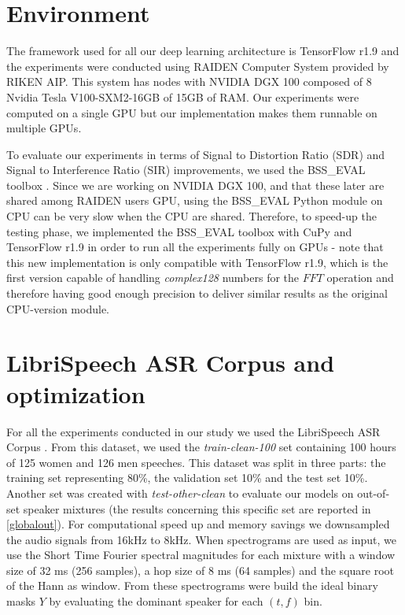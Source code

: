 \documentclass[master, tikz, final,11pt, dvipdfmx]{iscs-thesis}
\begin{document}
\section{Environment}

The framework used for all our deep learning architecture is TensorFlow r1.9 \cite{TF} and the experiments were conducted using RAIDEN Computer System provided by RIKEN AIP. This system has nodes with NVIDIA DGX 100 composed of 8 Nvidia Tesla V100-SXM2-16GB of 15GB of RAM. Our experiments were computed on a single GPU but our implementation makes them runnable on multiple GPUs. 

To evaluate our experiments in terms of Signal to Distortion Ratio (SDR) and Signal to Interference Ratio (SIR) improvements, we used the BSS\_EVAL toolbox \cite{BSS}. Since we are working on NVIDIA DGX 100, and that these later are shared among RAIDEN users GPU, using the BSS\_EVAL Python module on CPU can be very slow when the CPU are shared. Therefore, to speed-up the testing phase, we implemented the BSS\_EVAL toolbox with CuPy \cite{cupy} and TensorFlow r1.9 in order to run all the experiments fully on GPUs - note that this new implementation is only compatible with TensorFlow r1.9, which is the first version capable of handling \textit{complex128} numbers for the $FFT$ operation and therefore having good enough precision to deliver similar results as the original CPU-version module.

\section{LibriSpeech ASR Corpus and optimization}

For all the experiments conducted in our study we used the LibriSpeech ASR Corpus \cite{LIBRI}. From this dataset, we used the \textit{train-clean-100} set containing 100 hours of 125 women and 126 men speeches. This dataset was split in three parts: the training set representing 80\%, the validation set 10\% and the test set 10\%. Another set was created with \textit{test-other-clean} to evaluate our models on out-of-set speaker mixtures (the results concerning this specific set are reported in \autoref{globalout}). For computational speed up and memory savings we downsampled the audio signals from 16kHz to 8kHz.
When spectrograms are used as input, we use the Short Time Fourier spectral magnitudes for each mixture with a window size of 32 ms (256 samples), a hop size of 8 ms (64 samples) and the square root of the Hann as window. From these spectrograms were build the ideal binary masks $Y$ by evaluating the dominant speaker for each $(t,f)$ bin.
\end{document}
